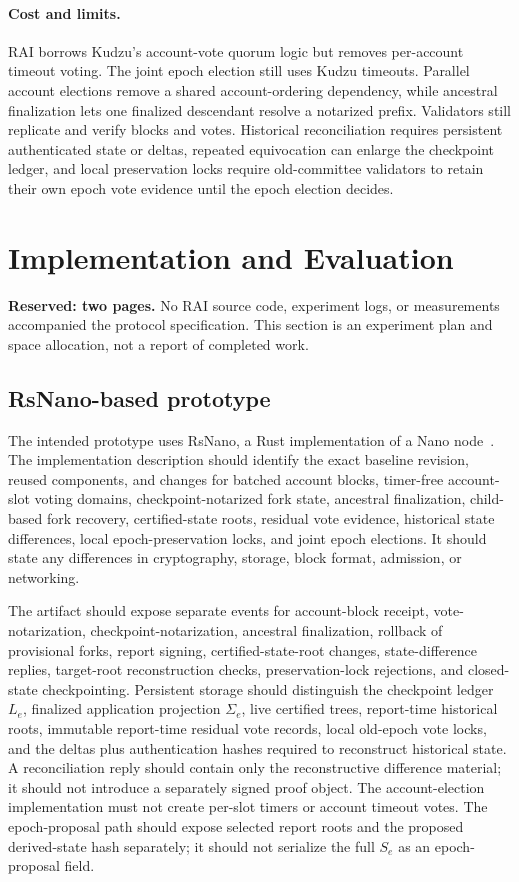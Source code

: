 \documentclass[10pt,twocolumn]{article}
\begin{document}
\paragraph{Cost and limits.} RAI borrows Kudzu's account-vote quorum logic but removes per-account timeout voting. The joint epoch election still uses Kudzu timeouts. Parallel account elections remove a shared account-ordering dependency, while ancestral finalization lets one finalized descendant resolve a notarized prefix. Validators still replicate and verify blocks and votes. Historical reconciliation requires persistent authenticated state or deltas, repeated equivocation can enlarge the checkpoint ledger, and local preservation locks require old-committee validators to retain their own epoch vote evidence until the epoch election decides.

\section{Implementation and Evaluation}
\noindent\textbf{Reserved: two pages.} No RAI source code, experiment logs, or measurements accompanied the protocol specification. This section is an experiment plan and space allocation, not a report of completed work.

\subsection{RsNano-based prototype}
The intended prototype uses RsNano, a Rust implementation of a Nano node~\cite{RsNano}. The implementation description should identify the exact baseline revision, reused components, and changes for batched account blocks, timer-free account-slot voting domains, checkpoint-notarized fork state, ancestral finalization, child-based fork recovery, certified-state roots, residual vote evidence, historical state differences, local epoch-preservation locks, and joint epoch elections. It should state any differences in cryptography, storage, block format, admission, or networking.

The artifact should expose separate events for account-block receipt, vote-notarization, checkpoint-notarization, ancestral finalization, rollback of provisional forks, report signing, certified-state-root changes, state-difference replies, target-root reconstruction checks, preservation-lock rejections, and closed-state checkpointing. Persistent storage should distinguish the checkpoint ledger $L_e$, finalized application projection $\Sigma_e$, live certified trees, report-time historical roots, immutable report-time residual vote records, local old-epoch vote locks, and the deltas plus authentication hashes required to reconstruct historical state. A reconciliation reply should contain only the reconstructive difference material; it should not introduce a separately signed proof object. The account-election implementation must not create per-slot timers or account timeout votes. The epoch-proposal path should expose selected report roots and the proposed derived-state hash separately; it should not serialize the full $S_e$ as an epoch-proposal field.
\end{document}
